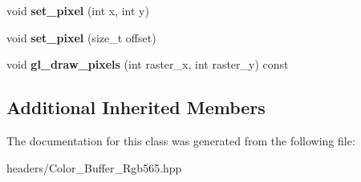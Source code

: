 \begin{DoxyCompactItemize}
\mbox{\label{class_project1__3_d_a_1_1_color___buffer___rgb565_a0d7f635a78df502cf3a4c0d650881dd1}} 
void {\bfseries set\+\_\+pixel} (int x, int y)
\item 
\mbox{\label{class_project1__3_d_a_1_1_color___buffer___rgb565_afaff90b68dbf937b27b9721cfc3e88b0}} 
void {\bfseries set\+\_\+pixel} (size\+\_\+t offset)
\item 
\mbox{\label{class_project1__3_d_a_1_1_color___buffer___rgb565_a9a4c5d99a3dd5529b6299c25262cfd77}} 
void {\bfseries gl\+\_\+draw\+\_\+pixels} (int raster\+\_\+x, int raster\+\_\+y) const
\end{DoxyCompactItemize}
\subsection*{Additional Inherited Members}


The documentation for this class was generated from the following file\+:\begin{DoxyCompactItemize}
\item 
headers/Color\+\_\+\+Buffer\+\_\+\+Rgb565.\+hpp\end{DoxyCompactItemize}
